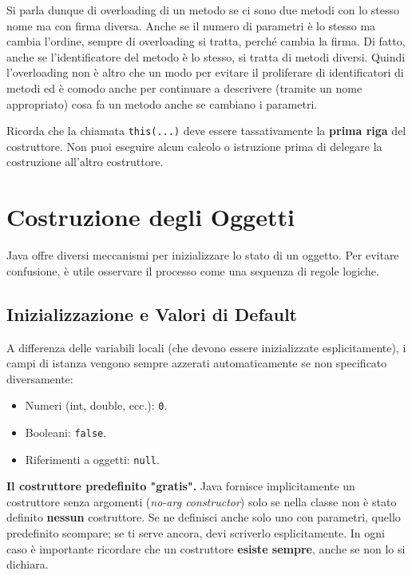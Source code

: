 \begin{observation}
    Si parla dunque di overloading di un metodo se ci sono due metodi con lo stesso nome ma con firma diversa. Anche se il numero di parametri è lo stesso ma cambia l'ordine, sempre di overloading si tratta, perché cambia la firma. Di fatto, anche se l'identificatore del metodo è lo stesso, si tratta di metodi diversi. Quindi l'overloading non è altro che un modo per evitare il proliferare di identificatori di metodi ed è comodo anche per continuare a descrivere (tramite un nome appropriato) cosa fa un metodo anche se cambiano i parametri.
\end{observation}

\begin{warningbox}[]
    Ricorda che la chiamata \texttt{this(...)} deve essere tassativamente la \textbf{prima riga} del costruttore. Non puoi eseguire alcun calcolo o istruzione prima di delegare la costruzione all'altro costruttore.
\end{warningbox}

\section{Costruzione degli Oggetti}

Java offre diversi meccanismi per inizializzare lo stato di un oggetto. Per evitare confusione, è utile osservare il processo come una sequenza di regole logiche.


\subsection{Inizializzazione e Valori di Default}
A differenza delle variabili locali (che devono essere inizializzate esplicitamente), i campi di istanza vengono sempre azzerati automaticamente se non specificato diversamente:
\begin{itemize}
    \item Numeri (int, double, ecc.): \texttt{0}.
    \item Booleani: \texttt{false}.
    \item Riferimenti a oggetti: \texttt{null}.
\end{itemize}

\begin{warningbox}[]
    \textbf{Il costruttore predefinito "gratis".}
    Java fornisce implicitamente un costruttore senza argomenti (\textit{no-arg constructor}) solo se nella classe non è stato definito \textbf{nessun} costruttore. Se ne definisci anche solo uno con parametri, quello predefinito scompare; se ti serve ancora, devi scriverlo esplicitamente. In ogni caso è importante ricordare che un costruttore \textbf{esiste sempre}, anche se non lo si dichiara.
\end{warningbox}

